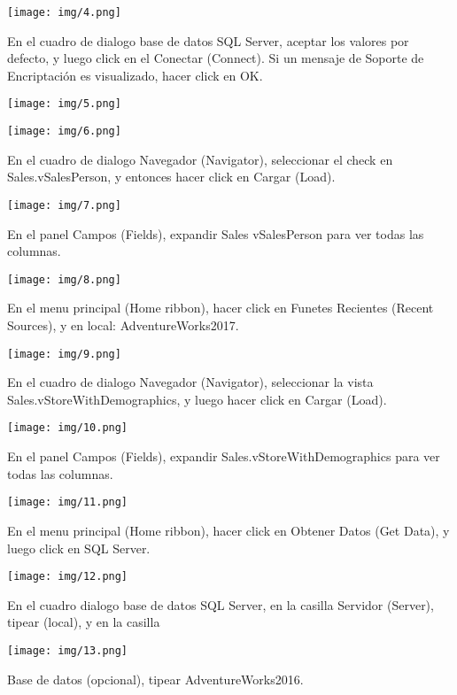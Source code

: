 \documentclass[12pt,letterpaper]{article}
\begin{document}
\begin{center}
    \texttt{[image: img/4.png]}  
\end{center}
En el cuadro de dialogo base de datos SQL Server, aceptar los valores por defecto, y luego click en el
Conectar (Connect). Si un mensaje de Soporte de Encriptación es visualizado, hacer click en OK.
\begin{center}
    \texttt{[image: img/5.png]}  
\end{center}
\begin{center}
    \texttt{[image: img/6.png]}  
\end{center}
En el cuadro de dialogo Navegador (Navigator), seleccionar el check en Sales.vSalesPerson, y entonces hacer
click en Cargar (Load).
\begin{center}
    \texttt{[image: img/7.png]}  
\end{center}
En el panel Campos (Fields), expandir Sales vSalesPerson para ver todas las columnas.
\begin{center}
    \texttt{[image: img/8.png]}  
\end{center}
En el menu principal (Home ribbon), hacer click en Funetes Recientes (Recent Sources), y en local:
AdventureWorks2017.
\begin{center}
    \texttt{[image: img/9.png]}  
\end{center}
En el cuadro de dialogo Navegador (Navigator), seleccionar la vista Sales.vStoreWithDemographics, y luego
hacer click en Cargar (Load).
\begin{center}
    \texttt{[image: img/10.png]}  
\end{center}
En el panel Campos (Fields), expandir Sales.vStoreWithDemographics para ver todas las columnas.
\begin{center}
    \texttt{[image: img/11.png]}  
\end{center}
En el menu principal (Home ribbon), hacer click en Obtener Datos (Get Data), y luego click en SQL Server.
\begin{center}
    \texttt{[image: img/12.png]}  
\end{center}
En el cuadro dialogo base de datos SQL Server, en la casilla Servidor (Server), tipear (local), y en la casilla
\begin{center}
    \texttt{[image: img/13.png]}  
\end{center}
Base de datos (opcional), tipear AdventureWorks2016.\\\\
\end{document}
